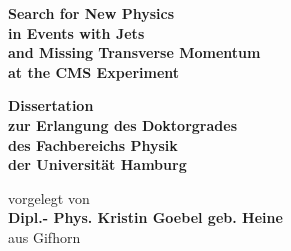 \documentclass[
twoside=true,
BCOR10mm,
headsepline,     %
headings=normal,
open=right,
numbers=noenddot, %
a4paper
]{scrreprt} %
\author{Kristin Goebel}
\begin{document}
\begin{titlepage}
  \begin{center}
    \thispagestyle{empty}
    \vspace*{1cm}
    \begin{doublespace} 
      \textbf{\huge Search for New Physics}\\
      \textbf{\huge in Events with Jets}\\
      \textbf{\huge and Missing Transverse Momentum}\\
      \textbf{\huge at the CMS Experiment} \\
      \vskip1.5cm
      \begin{Large} 
        \textbf{Dissertation\\
          zur Erlangung des Doktorgrades\\
          des Fachbereichs Physik\\
          der Universit\"{a}t Hamburg\\}
      \end{Large}
      \vskip2cm
      \begin{large}
        vorgelegt von\\
        {\bf Dipl.- Phys. Kristin Goebel geb. Heine}\\
        aus Gifhorn
        \vfill
      \end{large}
    \end{doublespace} 
  \end{center}
\end{titlepage}


\newpage 
\thispagestyle{empty}
\quad 
\newpage
\thispagestyle{empty}
\end{document}
